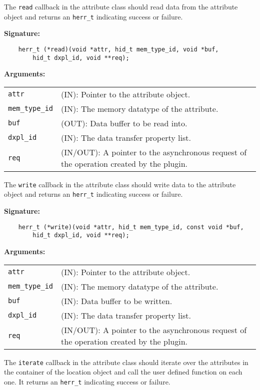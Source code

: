 The {\tt read} callback in the attribute class should read data from
the attribute object and returns an {\tt herr\_t} indicating success or
failure.

\textbf{Signature:}
\begin{lstlisting}
    herr_t (*read)(void *attr, hid_t mem_type_id, void *buf, 
        hid_t dxpl_id, void **req);
\end{lstlisting}

\textbf{Arguments:}\\
\begin{tabular}{l p{10cm}}
  {\tt attr} & (IN): Pointer to the attribute object.\\
  {\tt mem\_type\_id} & (IN): The memory datatype of the attribute.\\
  {\tt buf} & (OUT): Data buffer to be read into.\\
  {\tt dxpl\_id} & (IN): The data transfer property list.\\
  {\tt req} & (IN/OUT): A pointer to the asynchronous request of the
  operation created by the plugin.\\
\end{tabular}

The {\tt write} callback in the attribute class should write data to
the attribute object and returns an {\tt herr\_t} indicating success or
failure.

\textbf{Signature:}
\begin{lstlisting}
    herr_t (*write)(void *attr, hid_t mem_type_id, const void *buf, 
        hid_t dxpl_id, void **req);
\end{lstlisting}

\textbf{Arguments:}\\
\begin{tabular}{l p{10cm}}
  {\tt attr} & (IN): Pointer to the attribute object.\\
  {\tt mem\_type\_id} & (IN): The memory datatype of the attribute.\\
  {\tt buf} & (IN): Data buffer to be written.\\
  {\tt dxpl\_id} & (IN): The data transfer property list.\\
  {\tt req} & (IN/OUT): A pointer to the asynchronous request of the
  operation created by the plugin.\\
\end{tabular}

The {\tt iterate} callback in the attribute class should iterate over
the attributes in the container of the location object and call the
user defined function on each one. It returns an {\tt herr\_t}
indicating success or failure.

